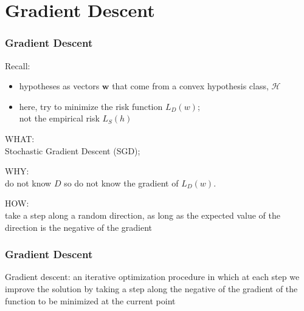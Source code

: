 \section{Gradient Descent}

\begin{frame}
\frametitle{Gradient Descent}

Recall:\\
\begin{itemize}
\item hypotheses as vectors $\mathbf{w}$ that come from a convex hypothesis class, $\mathcal{H}$
\item here, try to minimize the risk function $L_D(w)$; \\
      not the empirical risk $L_S (h)$
\end{itemize}

WHAT:\\
Stochastic Gradient Descent (SGD);

WHY:\\
do not know $D$ so do not know the gradient of $L_D(w)$.

HOW:\\
take a step along a random direction, as long as
the expected value of the direction is the negative of the gradient

\end{frame}

\begin{frame}
\frametitle{Gradient Descent}
Gradient descent: an iterative optimization procedure in which
at each step we improve the solution by taking a step along the negative of
the gradient of the function to be minimized at the current point

\end{frame}
